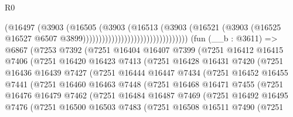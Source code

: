 \begin{lexlean}{R0}
\begin{coremodule}
                                                    (@16497
                                                      (@3903
                                                        (@16505
                                                          (@3903
                                                            (@16513
                                                              (@3903
                                                                (@16521
                                                                  (@3903
                                                                    (@16525
                                                                      @16527
                                                                      @6507
                                                                      @3899)))))))))))))))))))))))))))))))))
    (fun (__b : @3611) =>
    @6867
      (@7253
        @7392
        (@7251
          @16404
          @16407
          @7399
          (@7251
            @16412
            @16415
            @7406
            (@7251
              @16420
              @16423
              @7413
              (@7251
                @16428
                @16431
                @7420
                (@7251
                  @16436
                  @16439
                  @7427
                  (@7251
                    @16444
                    @16447
                    @7434
                    (@7251
                      @16452
                      @16455
                      @7441
                      (@7251
                        @16460
                        @16463
                        @7448
                        (@7251
                          @16468
                          @16471
                          @7455
                          (@7251
                            @16476
                            @16479
                            @7462
                            (@7251
                              @16484
                              @16487
                              @7469
                              (@7251
                                @16492
                                @16495
                                @7476
                                (@7251
                                  @16500
                                  @16503
                                  @7483
                                  (@7251
                                    @16508
                                    @16511
                                    @7490
                                    (@7251

\end{coremodule}
\end{lexlean}
